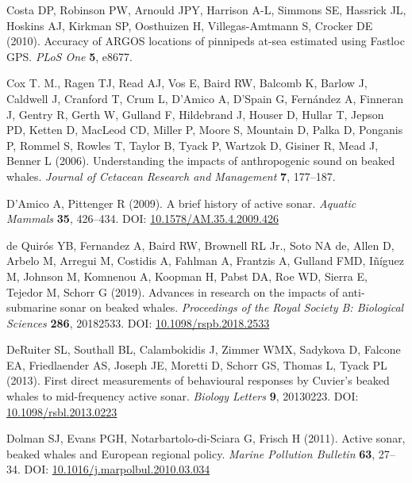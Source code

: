 \documentclass[
]{article}
\begin{document}
\leavevmode\hypertarget{ref-Costa2010}{}%
Costa DP, Robinson PW, Arnould JPY, Harrison A-L, Simmons SE, Hassrick JL, Hoskins AJ, Kirkman SP, Oosthuizen H, Villegas-Amtmann S, Crocker DE (2010). Accuracy of ARGOS locations of pinnipeds at-sea estimated using Fastloc GPS. \emph{PLoS One} \textbf{5}, e8677.

\leavevmode\hypertarget{ref-Cox2006}{}%
Cox T. M., Ragen TJ, Read AJ, Vos E, Baird RW, Balcomb K, Barlow J, Caldwell J, Cranford T, Crum L, D'Amico A, D'Spain G, Fernández A, Finneran J, Gentry R, Gerth W, Gulland F, Hildebrand J, Houser D, Hullar T, Jepson PD, Ketten D, MacLeod CD, Miller P, Moore S, Mountain D, Palka D, Ponganis P, Rommel S, Rowles T, Taylor B, Tyack P, Wartzok D, Gisiner R, Mead J, Benner L (2006). Understanding the impacts of anthropogenic sound on beaked whales. \emph{Journal of Cetacean Research and Management} \textbf{7}, 177--187.

\leavevmode\hypertarget{ref-Damico2009}{}%
D'Amico A, Pittenger R (2009). A brief history of active sonar. \emph{Aquatic Mammals} \textbf{35}, 426--434. DOI: \href{https://doi.org/10.1578/AM.35.4.2009.426}{10.1578/AM.35.4.2009.426}

\leavevmode\hypertarget{ref-deQuiros2019}{}%
de Quirós YB, Fernandez A, Baird RW, Brownell RL Jr., Soto NA de, Allen D, Arbelo M, Arregui M, Costidis A, Fahlman A, Frantzis A, Gulland FMD, Iñíguez M, Johnson M, Komnenou A, Koopman H, Pabst DA, Roe WD, Sierra E, Tejedor M, Schorr G (2019). Advances in research on the impacts of anti-submarine sonar on beaked whales. \emph{Proceedings of the Royal Society B: Biological Sciences} \textbf{286}, 20182533. DOI: \href{https://doi.org/10.1098/rspb.2018.2533}{10.1098/rspb.2018.2533}

\leavevmode\hypertarget{ref-DeRuiter2013}{}%
DeRuiter SL, Southall BL, Calambokidis J, Zimmer WMX, Sadykova D, Falcone EA, Friedlaender AS, Joseph JE, Moretti D, Schorr GS, Thomas L, Tyack PL (2013). First direct measurements of behavioural responses by Cuvier's beaked whales to mid-frequency active sonar. \emph{Biology Letters} \textbf{9}, 20130223. DOI: \href{https://doi.org/10.1098/rsbl.2013.0223}{10.1098/rsbl.2013.0223}

\leavevmode\hypertarget{ref-Dolman2011}{}%
Dolman SJ, Evans PGH, Notarbartolo-di-Sciara G, Frisch H (2011). Active sonar, beaked whales and European regional policy. \emph{Marine Pollution Bulletin} \textbf{63}, 27--34. DOI: \href{https://doi.org/10.1016/j.marpolbul.2010.03.034}{10.1016/j.marpolbul.2010.03.034}
\end{document}
